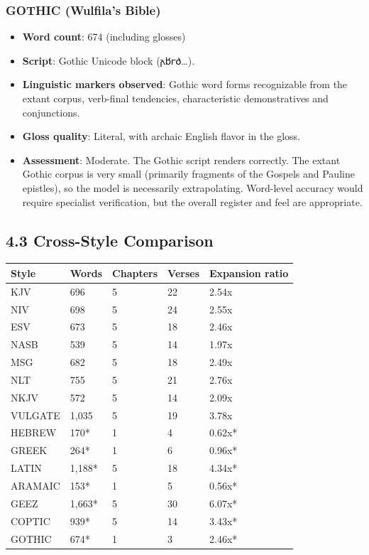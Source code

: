 \documentclass[10pt, letterpaper, twocolumn]{article}
\providecommand{\tightlist}{\setlength{\itemsep}{0pt}\setlength{\parskip}{0pt}}
\begin{document}
\subsubsection*{GOTHIC (Wulfila's Bible)}\label{gothic-wulfilas-bible}

\begin{itemize}
\tightlist
\item
  \textbf{Word count}: 674 (including glosses)
\item
  \textbf{Script}: Gothic Unicode block (𐌰𐌱𐌲𐌳\ldots).
\item
  \textbf{Linguistic markers observed}: Gothic word forms recognizable from the extant corpus, verb-final tendencies, characteristic demonstratives and conjunctions.
\item
  \textbf{Gloss quality}: Literal, with archaic English flavor in the gloss.
\item
  \textbf{Assessment}: Moderate. The Gothic script renders correctly. The extant Gothic corpus is very small (primarily fragments of the Gospels and Pauline epistles), so the model is necessarily extrapolating. Word-level accuracy would require specialist verification, but the overall register and feel are appropriate.
\end{itemize}

\subsection*{4.3 Cross-Style Comparison}\label{cross-style-comparison}

{\def\LTcaptype{none} %
\begin{tabular}[]{@{}lllll@{}}
\toprule\noalign{}
Style & Words & Chapters & Verses & Expansion ratio \\
\midrule\noalign{}
\bottomrule\noalign{}
KJV & 696 & 5 & 22 & 2.54x \\
NIV & 698 & 5 & 24 & 2.55x \\
ESV & 673 & 5 & 18 & 2.46x \\
NASB & 539 & 5 & 14 & 1.97x \\
MSG & 682 & 5 & 18 & 2.49x \\
NLT & 755 & 5 & 21 & 2.76x \\
NKJV & 572 & 5 & 14 & 2.09x \\
VULGATE & 1,035 & 5 & 19 & 3.78x \\
HEBREW & 170* & 1 & 4 & 0.62x* \\
GREEK & 264* & 1 & 6 & 0.96x* \\
LATIN & 1,188* & 5 & 18 & 4.34x* \\
ARAMAIC & 153* & 1 & 5 & 0.56x* \\
GEEZ & 1,663* & 5 & 30 & 6.07x* \\
COPTIC & 939* & 5 & 14 & 3.43x* \\
GOTHIC & 674* & 1 & 3 & 2.46x* \\
\end{tabular}
}
\end{document}
